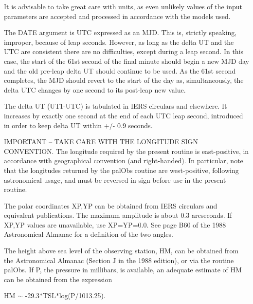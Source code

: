 \documentclass[twoside,11pt]{article}
\renewcommand{\_}{\texttt{\symbol{95}}}
\newcommand{\sstitem}{\item}
\newcommand{\sstitem}{\item}
\begin{document}
{{{         \sstitem
         It is advisable to take great care with units, as even
           unlikely values of the input parameters are accepted and
           processed in accordance with the models used.

         \sstitem
         The DATE argument is UTC expressed as an MJD.  This is,
           strictly speaking, improper, because of leap seconds.  However,
           as long as the delta UT and the UTC are consistent there
           are no difficulties, except during a leap second.  In this
           case, the start of the 61st second of the final minute should
           begin a new MJD day and the old pre-leap delta UT should
           continue to be used.  As the 61st second completes, the MJD
           should revert to the start of the day as, simultaneously,
           the delta UTC changes by one second to its post-leap new value.

         \sstitem
         The delta UT (UT1-UTC) is tabulated in IERS circulars and
           elsewhere.  It increases by exactly one second at the end of
           each UTC leap second, introduced in order to keep delta UT
           within $+$/- 0.9 seconds.

         \sstitem
         IMPORTANT -- TAKE CARE WITH THE LONGITUDE SIGN CONVENTION.
           The longitude required by the present routine is east-positive,
           in accordance with geographical convention (and right-handed).
           In particular, note that the longitudes returned by the
           palObs routine are west-positive, following astronomical
           usage, and must be reversed in sign before use in the present
           routine.

         \sstitem
         The polar coordinates XP,YP can be obtained from IERS
           circulars and equivalent publications.  The maximum amplitude
           is about 0.3 arcseconds.  If XP,YP values are unavailable,
           use XP=YP=0.0.  See page B60 of the 1988 Astronomical Almanac
           for a definition of the two angles.

         \sstitem
         The height above sea level of the observing station, HM,
           can be obtained from the Astronomical Almanac (Section J
           in the 1988 edition), or via the routine palObs.  If P,
           the pressure in millibars, is available, an adequate
           estimate of HM can be obtained from the expression

      }
              HM $\sim$ -29.3$*$TSL$*$log(P/1013.25).

}}
\end{document}
